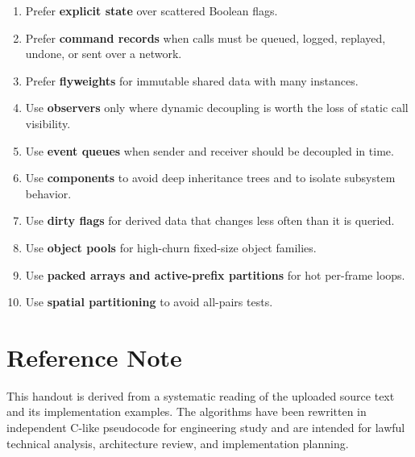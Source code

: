 \documentclass[10pt,letterpaper]{article}
\begin{document}
\begin{enumerate}
\item Prefer \textbf{explicit state} over scattered Boolean flags.
\item Prefer \textbf{command records} when calls must be queued, logged, replayed, undone, or sent over a network.
\item Prefer \textbf{flyweights} for immutable shared data with many instances.
\item Use \textbf{observers} only where dynamic decoupling is worth the loss of static call visibility.
\item Use \textbf{event queues} when sender and receiver should be decoupled in time.
\item Use \textbf{components} to avoid deep inheritance trees and to isolate subsystem behavior.
\item Use \textbf{dirty flags} for derived data that changes less often than it is queried.
\item Use \textbf{object pools} for high-churn fixed-size object families.
\item Use \textbf{packed arrays and active-prefix partitions} for hot per-frame loops.
\item Use \textbf{spatial partitioning} to avoid all-pairs tests.
\end{enumerate}


\clearpage
\section*{Reference Note}
This handout is derived from a systematic reading of the uploaded source text and its implementation examples. The algorithms have been rewritten in independent C-like pseudocode for engineering study and are intended for lawful technical analysis, architecture review, and implementation planning.
\end{document}
